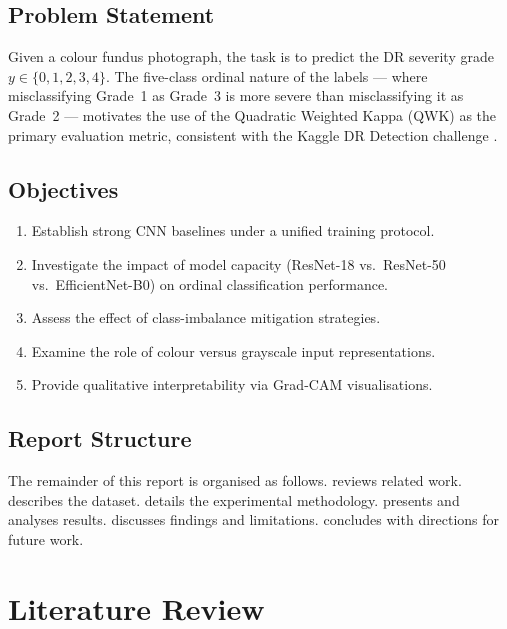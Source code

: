 \documentclass[12pt, a4paper]{article}
\begin{document}
\subsection{Problem Statement}
\label{ssec:problem}

Given a colour fundus photograph, the task is to predict the DR severity grade
$y \in \{0, 1, 2, 3, 4\}$.
The five-class ordinal nature of the labels --- where misclassifying Grade~1 as
Grade~3 is more severe than misclassifying it as Grade~2 --- motivates the use of
the Quadratic Weighted Kappa (QWK) as the primary evaluation metric, consistent
with the Kaggle DR Detection challenge \cite{TODO_kaggle}.

\subsection{Objectives}
\label{ssec:objectives}

\begin{enumerate}[label=\arabic*.]
    \item Establish strong CNN baselines under a unified training protocol.
    \item Investigate the impact of model capacity (ResNet-18 vs.\ ResNet-50 vs.\
          EfficientNet-B0) on ordinal classification performance.
    \item Assess the effect of class-imbalance mitigation strategies.
    \item Examine the role of colour versus grayscale input representations.
    \item Provide qualitative interpretability via Grad-CAM visualisations.
\end{enumerate}

\subsection{Report Structure}
The remainder of this report is organised as follows.
 reviews related work.
 describes the dataset.
 details the experimental methodology.
 presents and analyses results.
 discusses findings and limitations.
 concludes with directions for future work.

\section{Literature Review}
\label{sec:litreview}
\end{document}
